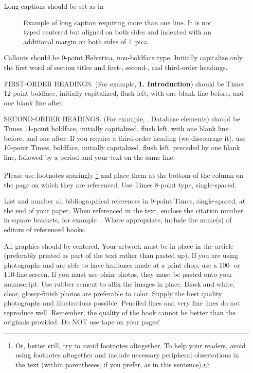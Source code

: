 \documentclass[times, 10pt,twocolumn]{article}
\begin{document}
	\noindent Long captions should be set as in 
	\begin{figure}[h] 
	   \caption{Example of long caption requiring more than one line. It is 
	     not typed centered but aligned on both sides and indented with an 
	     additional margin on both sides of 1~pica.}
	\end{figure}

	\noindent Callouts should be 9-point Helvetica, non-boldface type. 
	Initially capitalize only the first word of section titles and first-, 
	second-, and third-order headings.

	FIRST-ORDER HEADINGS. (For example, {\large \bf 1. Introduction}) 
	should be Times 12-point boldface, initially capitalized, flush left, 
	with one blank line before, and one blank line after.

	SECOND-ORDER HEADINGS. (For example, {. Database elements}) 
	should be Times 11-point boldface, initially capitalized, flush left, 
	with one blank line before, and one after. If you require a third-order 
	heading (we discourage it), use 10-point Times, boldface, initially 
	capitalized, flush left, preceded by one blank line, followed by a period 
	and your text on the same line.


	Please use footnotes sparingly%
	\footnote
	   {%
	     Or, better still, try to avoid footnotes altogether.  To help your 
	     readers, avoid using footnotes altogether and include necessary 
	     peripheral observations in the text (within parentheses, if you 
	     prefer, as in this sentence).
	   }
	and place them at the bottom of the column on the page on which they are 
	referenced. Use Times 8-point type, single-spaced.


	List and number all bibliographical references in 9-point Times, 
	single-spaced, at the end of your paper. When referenced in the text, 
	enclose the citation number in square brackets, for example~\cite{ex1}. 
	Where appropriate, include the name(s) of editors of referenced books.


	All graphics should be centered. Your artwork must be in place in the 
	article (preferably printed as part of the text rather than pasted up). 
	If you are using photographs and are able to have halftones made at a 
	print shop, use a 100- or 110-line screen. If you must use plain photos, 
	they must be pasted onto your manuscript. Use rubber cement to affix the 
	images in place. Black and white, clear, glossy-finish photos are 
	preferable to color. Supply the best quality photographs and 
	illustrations possible. Penciled lines and very fine lines do not 
	reproduce well. Remember, the quality of the book cannot be better than 
	the originals provided. Do NOT use tape on your pages!
\end{document}
